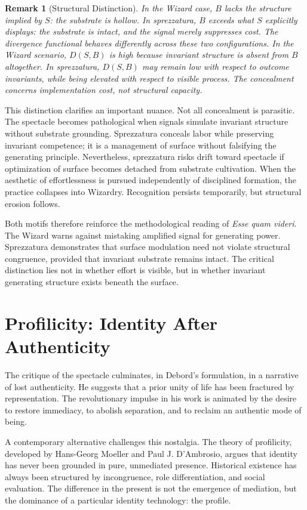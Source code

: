 \documentclass[11pt]{article}
\newtheorem{remark}{Remark}
\begin{document}
\begin{remark}[Structural Distinction]
In the Wizard case, $B$ lacks the structure implied by $S$: the substrate is hollow. In sprezzatura, $B$ exceeds what $S$ explicitly displays: the substrate is intact, and the signal merely suppresses cost. The divergence functional behaves differently across these two configurations. In the Wizard scenario, $D(S,B)$ is high because invariant structure is absent from $B$ altogether. In sprezzatura, $D(S,B)$ may remain low with respect to outcome invariants, while being elevated with respect to visible process. The concealment concerns implementation cost, not structural capacity.
\end{remark}

This distinction clarifies an important nuance. Not all concealment is parasitic. The spectacle becomes pathological when signals simulate invariant structure without substrate grounding. Sprezzatura conceals labor while preserving invariant competence; it is a management of surface without falsifying the generating principle. Nevertheless, sprezzatura risks drift toward spectacle if optimization of surface becomes detached from substrate cultivation. When the aesthetic of effortlessness is pursued independently of disciplined formation, the practice collapses into Wizardry. Recognition persists temporarily, but structural erosion follows.

Both motifs therefore reinforce the methodological reading of \textit{Esse quam videri}. The Wizard warns against mistaking amplified signal for generating power. Sprezzatura demonstrates that surface modulation need not violate structural congruence, provided that invariant substrate remains intact. The critical distinction lies not in whether effort is visible, but in whether invariant generating structure exists beneath the surface.

\section{Profilicity: Identity After Authenticity}

The critique of the spectacle culminates, in Debord's formulation, in a narrative of lost authenticity. He suggests that a prior unity of life has been fractured by representation. The revolutionary impulse in his work is animated by the desire to restore immediacy, to abolish separation, and to reclaim an authentic mode of being.

A contemporary alternative challenges this nostalgia. The theory of profilicity, developed by Hans-Georg Moeller and Paul J. D'Ambrosio, argues that identity has never been grounded in pure, unmediated presence. Historical existence has always been structured by incongruence, role differentiation, and social evaluation. The difference in the present is not the emergence of mediation, but the dominance of a particular identity technology: the profile.
\end{document}
